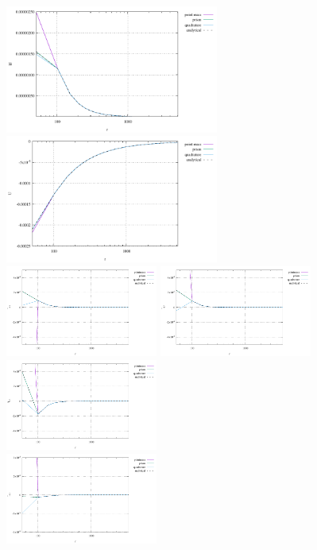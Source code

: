 \begin{center}
\includegraphics[width=7cm]{python_codes/fieldstone_84/cube/gravnorm}
\includegraphics[width=7cm]{python_codes/fieldstone_84/cube/gravpot}\\
\includegraphics[width=5cm]{python_codes/fieldstone_84/cube/tensor_xx}
\includegraphics[width=5cm]{python_codes/fieldstone_84/cube/tensor_yy}
\includegraphics[width=5cm]{python_codes/fieldstone_84/cube/tensor_zz}\\
\includegraphics[width=5cm]{python_codes/fieldstone_84/cube/tensor_xy}

\end{center}
